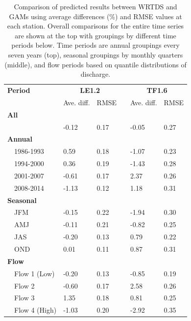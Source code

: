 \documentclass[letterpaper,12pt,oneside]{article}\usepackage[]{graphicx}\usepackage[]{color}
\begin{document}
\begin{table}[!tbp]
\caption{Comparison of predicted results between \ac{WRTDS} and \acp{GAM} using average differences (\%) and \ac{RMSE} values at each station.  Overall comparisons for the entire time series are shown at the top with groupings by different time periods below.  Time periods are annual groupings every seven years (top), seasonal groupings by monthly quarters (middle), and flow periods based on quantile distributions of discharge.\label{tab:perfbtw}} 
\begin{center}
\begin{tabular}{lllcll}
\hline\hline
\multicolumn{1}{l}{\bfseries Period}&\multicolumn{2}{c}{\bfseries LE1.2}&\multicolumn{1}{c}{\bfseries }&\multicolumn{2}{c}{\bfseries TF1.6}\tabularnewline
\cline{2-3} \cline{5-6}
\multicolumn{1}{l}{}&\multicolumn{1}{c}{Ave. diff.}&\multicolumn{1}{c}{\ac{RMSE}}&\multicolumn{1}{c}{}&\multicolumn{1}{c}{Ave. diff.}&\multicolumn{1}{c}{\ac{RMSE}}\tabularnewline
\hline
{\bfseries All}&&&&&\tabularnewline
~~&-0.12&0.17&&-0.05&0.27\tabularnewline
\hline
{\bfseries Annual}&&&&&\tabularnewline
~~1986-1993& 0.59&0.18&&-1.07&0.23\tabularnewline
~~1994-2000& 0.36&0.19&&-1.43&0.28\tabularnewline
~~2001-2007&-0.61&0.17&& 2.37&0.26\tabularnewline
~~2008-2014&-1.13&0.12&& 1.18&0.31\tabularnewline
\hline
{\bfseries Seasonal}&&&&&\tabularnewline
~~JFM&-0.15&0.22&&-1.94&0.30\tabularnewline
~~AMJ&-0.11&0.21&&-0.82&0.25\tabularnewline
~~JAS&-0.20&0.13&& 0.79&0.22\tabularnewline
~~OND& 0.01&0.11&& 0.87&0.31\tabularnewline
\hline
{\bfseries Flow}&&&&&\tabularnewline
~~Flow 1 (Low)&-0.20&0.13&&-0.85&0.19\tabularnewline
~~Flow 2&-0.60&0.17&& 2.58&0.26\tabularnewline
~~Flow 3& 1.35&0.18&& 0.81&0.25\tabularnewline
~~Flow 4 (High)&-1.03&0.20&&-2.92&0.35\tabularnewline
\hline
\end{tabular}\end{center}

\end{table}
\end{document}
